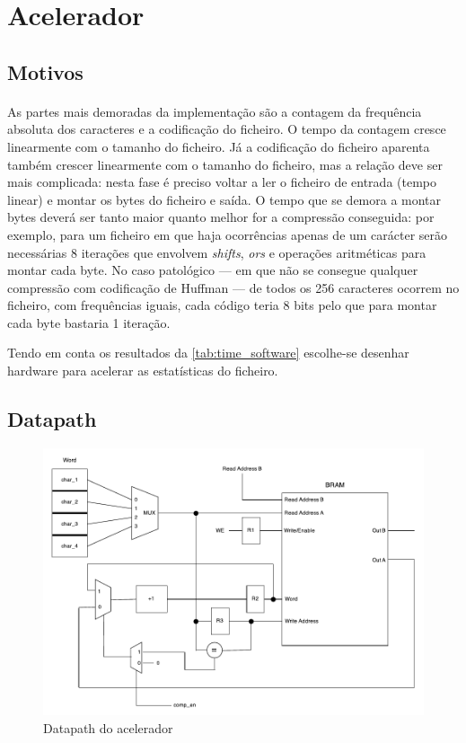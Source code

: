 \documentclass[a4paper]{article}
\begin{document}
	\section{Acelerador}
	\label{sec:accelerator}

  \subsection{Motivos}
  \paragraph{} As partes mais demoradas da implementação são a contagem da frequência absoluta dos caracteres e a codificação do ficheiro. O tempo da contagem cresce linearmente com o tamanho do ficheiro. Já a codificação do ficheiro aparenta também crescer linearmente com o tamanho do ficheiro, mas a relação deve ser mais complicada: nesta fase é preciso voltar a ler o ficheiro de entrada (tempo linear) e montar os bytes do ficheiro e saída. O tempo que se demora a montar bytes deverá ser tanto maior quanto melhor for a compressão conseguida: por exemplo, para um ficheiro em que haja ocorrências apenas de um carácter serão necessárias 8 iterações que envolvem \textit{shifts}, \textit{ors} e operações aritméticas para montar cada byte. No caso patológico --- em que não se consegue qualquer compressão com codificação de Huffman --- de todos os 256 caracteres ocorrem no ficheiro, com frequências iguais, cada código teria 8 bits pelo que para montar cada byte bastaria 1 iteração.

  Tendo em conta os resultados da \autoref{tab:time_software} escolhe-se desenhar hardware para acelerar as estatísticas do ficheiro.

  \subsection{Datapath}

	\begin{figure}[H]
		\centering
		\includegraphics[width=1.0\textwidth]{img/hw_datapath}
		\caption{Datapath do acelerador}
		\label{fig:hw_datapath}
	\end{figure}
\end{document}
